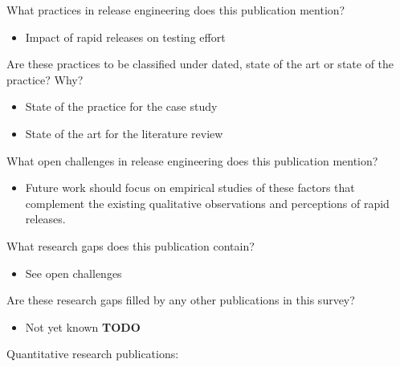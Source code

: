\documentclass[]{book}
\providecommand{\tightlist}{%
  \setlength{\itemsep}{0pt}\setlength{\parskip}{0pt}}
\begin{document}
What practices in release engineering does this publication mention?

\begin{itemize}
\tightlist
\item
  Impact of rapid releases on testing effort
\end{itemize}

Are these practices to be classified under dated, state of the art or
state of the practice? Why?

\begin{itemize}
\tightlist
\item
  State of the practice for the case study
\item
  State of the art for the literature review
\end{itemize}

What open challenges in release engineering does this publication
mention?

\begin{itemize}
\tightlist
\item
  Future work should focus on empirical studies of these factors that
  complement the existing qualitative observations and perceptions of
  rapid releases.
\end{itemize}

What research gaps does this publication contain?

\begin{itemize}
\tightlist
\item
  See open challenges
\end{itemize}

Are these research gaps filled by any other publications in this survey?

\begin{itemize}
\tightlist
\item
  Not yet known \textbf{TODO}
\end{itemize}

Quantitative research publications:
\end{document}
